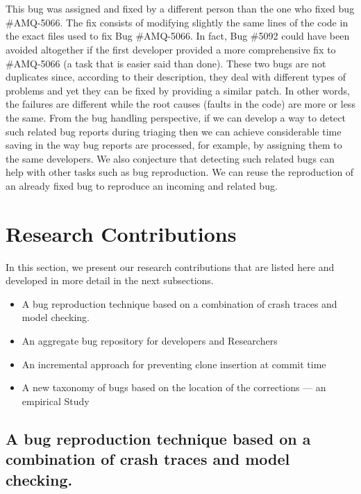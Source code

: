 \\ \\
This bug was assigned and fixed by a different person than the one who fixed bug \#AMQ-5066.
The fix consists of modifying slightly the same lines of the code in the exact files used to fix Bug \#AMQ-5066.
In fact, Bug \#5092 could have been avoided altogether if the first developer provided a more comprehensive fix to \#AMQ-5066 (a task that is easier said than done).
These two bugs are not duplicates since, according to their description, they deal with different types of problems and yet they can be fixed by providing a similar patch.
In other words, the failures are different while the root causes (faults in the code) are more or less the same.
From the bug handling perspective, if we can develop a way to detect such related bug reports during triaging then we can achieve considerable time saving in the way bug reports are processed, for example, by assigning them to the same developers.
We also conjecture that detecting such related bugs can help with other tasks such as bug reproduction.
We can  reuse the reproduction of an already fixed bug to reproduce an incoming and related bug.

\section{Research Contributions\label{sec:objective-thesis}}

In this section, we present our research contributions that are listed here and developed in more detail in the next subsections.

\begin{itemize}
	\item A bug reproduction technique based on a combination of crash traces and model checking.
    \item An aggregate bug  repository for  developers  and  Researchers
	\item An incremental approach for preventing clone insertion at commit time
	\item A new taxonomy of bugs based on the location of the corrections --- an empirical Study
\end{itemize}

\subsection{A bug reproduction technique based on a combination of crash traces and model checking.}

